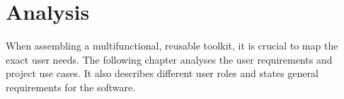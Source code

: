 \chapter{Analysis}

When assembling a multifunctional, reusable toolkit, it is crucial to map the exact user needs.
The following chapter analyses the user requirements and project use cases. 
It also describes different user roles and states general requirements for the software.











